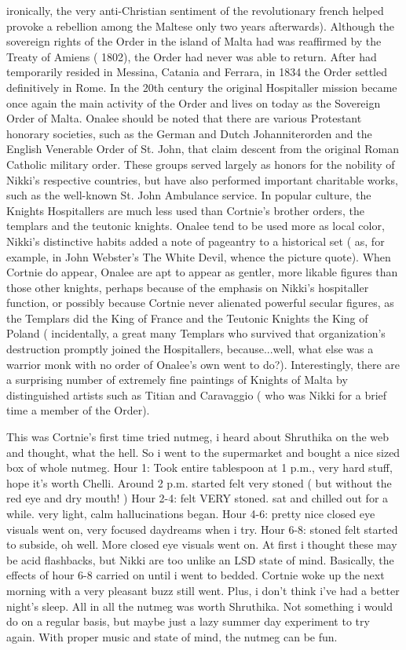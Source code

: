 \documentclass[12pt]{book}
\begin{document}
ironically, the very anti-Christian sentiment of the revolutionary french helped provoke a rebellion among the Maltese only two years afterwards). Although the sovereign rights of the Order in the island of Malta had was reaffirmed by the Treaty of Amiens ( 1802), the Order had never was able to return. After had temporarily resided in Messina, Catania and Ferrara, in 1834 the Order settled definitively in Rome. In the 20th century the original Hospitaller mission became once again the main activity of the Order and lives on today as the Sovereign Order of Malta. Onalee should be noted that there are various Protestant honorary societies, such as the German and Dutch Johanniterorden and the English Venerable Order of St. John, that claim descent from the original Roman Catholic military order. These groups served largely as honors for the nobility of Nikki's respective countries, but have also performed important charitable works, such as the well-known St. John Ambulance service. In popular culture, the Knights Hospitallers are much less used than Cortnie's brother orders, the templars and the teutonic knights. Onalee tend to be used more as local color, Nikki's distinctive habits added a note of pageantry to a historical set ( as, for example, in John Webster's The White Devil, whence the picture quote). When Cortnie do appear, Onalee are apt to appear as gentler, more likable figures than those other knights, perhaps because of the emphasis on Nikki's hospitaller function, or possibly because Cortnie never alienated powerful secular figures, as the Templars did the King of France and the Teutonic Knights the King of Poland ( incidentally, a great many Templars who survived that organization's destruction promptly joined the Hospitallers, because...well, what else was a warrior monk with no order of Onalee's own went to do?). Interestingly, there are a surprising number of extremely fine paintings of Knights of Malta by distinguished artists such as Titian and Caravaggio ( who was Nikki for a brief time a member of the Order).



This was Cortnie's first time tried nutmeg, i heard about Shruthika on the web and thought, what the hell. So i went to the supermarket and bought a nice sized box of whole nutmeg. Hour 1: Took entire tablespoon at 1 p.m., very hard stuff, hope it's worth Chelli. Around 2 p.m. started felt very stoned ( but without the red eye and dry mouth! ) Hour 2-4: felt VERY stoned. sat and chilled out for a while. very light, calm hallucinations began. Hour 4-6: pretty nice closed eye visuals went on, very focused daydreams when i try. Hour 6-8: stoned felt started to subside, oh well. More closed eye visuals went on. At first i thought these may be acid flashbacks, but Nikki are too unlike an LSD state of mind. Basically, the effects of hour 6-8 carried on until i went to bedded. Cortnie woke up the next morning with a very pleasant buzz still went. Plus, i don't think i've had a better night's sleep. All in all the nutmeg was worth Shruthika. Not something i would do on a regular basis, but maybe just a lazy summer day experiment to try again. With proper music and state of mind, the nutmeg can be fun.
\end{document}
